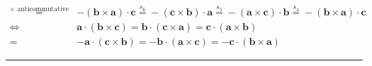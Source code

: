 \documentclass[
]{book}
\theoremstyle{definition}
\theoremstyle{definition}
\theoremstyle{definition}
\theoremstyle{definition}
\theoremstyle{remark}
\begin{document}
\[\begin{aligned}
\overset{\times\text{ anticommutative}}{=} & -\left(\boldsymbol{b}\times\boldsymbol{a}\right)\cdot\boldsymbol{c}\overset{s_{{\scriptscriptstyle 6}}}{=}-\left(\boldsymbol{c}\times\boldsymbol{b}\right)\cdot\boldsymbol{a}\overset{s_{{\scriptscriptstyle 5}}}{=}-\left(\boldsymbol{a}\times\boldsymbol{c}\right)\cdot\boldsymbol{b}\overset{s_{{\scriptscriptstyle 4}}}{=}-\left(\boldsymbol{b}\times\boldsymbol{a}\right)\cdot\boldsymbol{c}\\
\Leftrightarrow & \boldsymbol{a}\cdot\left(\boldsymbol{b}\times\boldsymbol{c}\right)=\boldsymbol{b}\cdot\left(\boldsymbol{c}\times\boldsymbol{a}\right)=\boldsymbol{c}\cdot\left(\boldsymbol{a}\times\boldsymbol{b}\right)\\
= & -\boldsymbol{a}\cdot\left(\boldsymbol{c}\times\boldsymbol{b}\right)=-\boldsymbol{b}\cdot\left(\boldsymbol{a}\times\boldsymbol{c}\right)=-\boldsymbol{c}\cdot\left(\boldsymbol{b}\times\boldsymbol{a}\right)
\end{aligned}
\]

\begin{center}\rule{0.5\linewidth}{0.5pt}\end{center}
\end{document}
